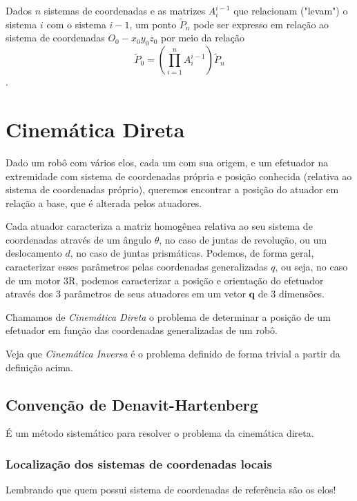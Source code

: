 
Dados $n$ sistemas de coordenadas e as matrizes $A_i^{i-1}$ que relacionam ("levam") o sistema $i$ com o sistema $i-1$, um ponto $\widetilde{P}_n$ pode ser expresso em relação ao sistema de coordenadas $O_0-x_0y_0z_0$ por meio da relação \[
\widetilde{P}_0 = \left( \prod_{i=1}^{n} A_i^{i-1}\right) \widetilde{P}_n
\].

\section*{Cinemática Direta}

Dado um robô com vários elos, cada um com sua origem, e um efetuador na extremidade com sistema de coordenadas própria e posição conhecida (relativa ao sistema de coordenadas próprio), queremos encontrar a posição do atuador em relação a base, que é alterada pelos atuadores.

Cada atuador caracteriza a matriz homogênea relativa ao seu sistema de coordenadas através de um ângulo $\theta$, no caso de juntas de revolução, ou um deslocamento $d$, no caso de juntas prismáticas. Podemos, de forma geral, caracterizar esses parâmetros pelas coordenadas generalizadas $q$, ou seja, no caso de um motor 3R, podemos caracterizar a posição e orientação do efetuador através dos 3 parâmetros de seus atuadores em um vetor $\bm{q}$ de 3 dimensões.

\begin{definition}
    Chamamos de \emph{Cinemática Direta} o problema de determinar a posição de um efetuador em função das coordenadas generalizadas de um robô.
\end{definition}

Veja que \emph{Cinemática Inversa} é o problema definido de forma trivial a partir da definição acima.

\subsection*{Convenção de Denavit-Hartenberg}

É um método sistemático para resolver o problema da cinemática direta.

\subsubsection*{Localização dos sistemas de coordenadas locais}

Lembrando que quem possui sistema de coordenadas de referência são os elos!

